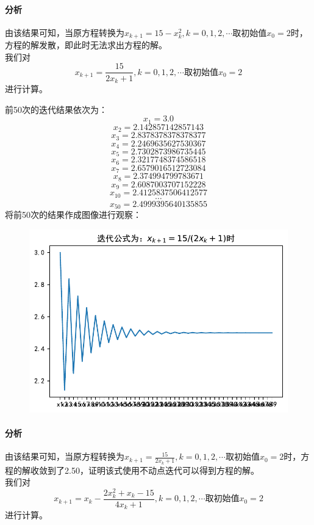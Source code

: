 \paragraph{分析}

由该结果可知，当原方程转换为$x_{k+1}=15-x_k^2,k=0,1,2,\cdots$取初始值$x_0=2$时，方程的解发散，即此时无法求出方程的解。\\



我们对\[ x_{k+1}=\frac{15}{2x_k+1},k=0,1,2,\cdots 取初始值x_0=2 \]进行计算。

前50次的迭代结果依次为：\[ x_1=3.0 \]
\[ x_2=2.142857142857143 \]
\[ x_3=2.8378378378378377 \]
\[ x_4=2.2469635627530367 \]
\[ x_5=2.7302873986735445 \]
\[ x_6=2.3217748374586518 \]
\[ x_7=2.6579016512723084 \]
\[ x_8=2.374994799783671  \]
\[ x_9=2.6087003707152228 \]
\[ x_{10}=2.4125837506412577 \]
\[ \cdots  \]
\[ x_{50}=2.4999395640135855 \]
将前50次的结果作成图像进行观察：
\begin{figure}[H]
	\centering
	\includegraphics[width=0.7\linewidth]{2-1-2.pdf}
	\caption{}
	\label{fig:2-1-2}
\end{figure}

\paragraph{分析}

由该结果可知，当原方程转换为$x_{k+1}=\frac{15}{2x_k+1},k=0,1,2,\cdots$取初始值$x_0=2$时，方程的解收敛到了2.50，证明该式使用不动点迭代可以得到方程的解。\\


我们对\[ x_{k+1}=x_k-\frac{2x_k^2+x_k-15}{4x_k+1},k=0,1,2,\cdots 取初始值x_0=2 \]进行计算。

